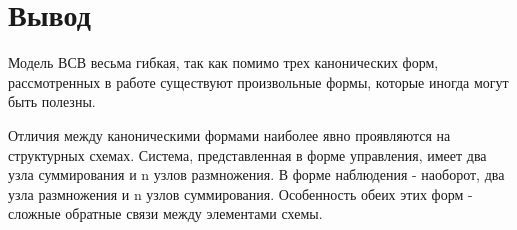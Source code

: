 \documentclass[14pt,a4paper,report]{report}
\begin{document}
\section{Вывод}

Модель ВСВ весьма гибкая, так как помимо трех канонических форм, рассмотренных в работе существуют произвольные формы, которые иногда могут быть полезны. 

Отличия между каноническими формами наиболее явно проявляются на структурных схемах. Система, представленная в форме управления, имеет два узла суммирования и n узлов размножения. В форме наблюдения - наоборот, два узла размножения и n узлов суммирования. Особенность обеих этих форм - сложные обратные связи между элементами схемы.
\end{document}
